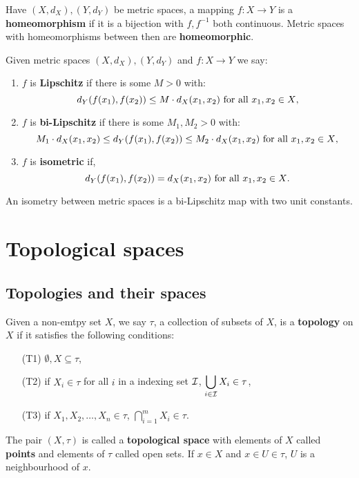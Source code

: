 \documentclass[../Year2.tex]{subfiles}
\begin{document}
\begin{definition}[Homeomorphism]
    Have $(X,d_X),(Y,d_Y)$ be metric spaces, a mapping $f:X\rightarrow Y$ is a \textbf{homeomorphism} if it is a bijection with $f,f^{-1}$ both continuous. Metric spaces with homeomorphisms between then are \textbf{homeomorphic}.
\end{definition}

\begin{definition}[Lipschitz]
    Given metric spaces $(X,d_X),(Y,d_Y)$ and $f:X\rightarrow Y$ we say:\begin{enumerate}
        \item  $f$ is \textbf{Lipschitz} if there is some $M>0$ with: 
        \[ d_Y(f(x_1),f(x_2))\leq M\cdot d_X(x_1,x_2) \ \text{\textcolor{black}{for all }} x_1,x_2\in X\text{\textcolor{black}{,}}\]
        \vspace{-20pt}
        \item  $f$ is \textbf{bi-Lipschitz} if there is some $M_1,M_2>0$ with: 
        \[ M_1\cdot d_X(x_1,x_2) \leq d_Y(f(x_1),f(x_2))\leq M_2\cdot d_X(x_1,x_2) \ \text{\textcolor{black}{for all }} x_1,x_2\in X\text{\textcolor{black}{,}}\]
        \vspace{-20pt}
        \item  $f$ is \textbf{isometric} if, 
        \[ d_Y(f(x_1),f(x_2)) =  d_X(x_1,x_2) \ \text{\textcolor{black}{for all }} x_1,x_2\in X\text{\textcolor{black}{.}}\]
        \vspace{-20pt}
    \end{enumerate}
\end{definition}

\begin{remark}
    An isometry between metric spaces is a bi-Lipschitz map with two unit constants.
\end{remark}

\section{Topological spaces}

\subsection{Topologies and their spaces}

\begin{definition}[Topology]
    Given a non-emtpy set $X$, we say $\tau$, a collection of subsets of $X$, is a \textbf{topology} on $X$ if it satisfies the following conditions: \begin{enumerate}
        \item[(T1)] $\emptyset,X\subseteq\tau$,
        \item[(T2)] if $X_i\in\tau$ for all $i$ in a indexing set $\mathcal{I}$, $\displaystyle \bigcup_{i\in\mathcal{I}}X_i\in\tau$,
        \vspace{-10pt}
        \item[(T3)] if $X_1,X_2,\ldots,X_n\in\tau$, $\displaystyle \bigcap_{i=1}^m X_i\in\tau$.
    \end{enumerate}
    The pair $(X,\tau)$ is called a \textbf{topological space} with elements of $X$ called \textbf{points} and elements of $\tau$ called open sets. If $x\in X$ and $x\in U\in\tau$, $U$ is a neighbourhood of $x$.
\end{definition}
\end{document}
